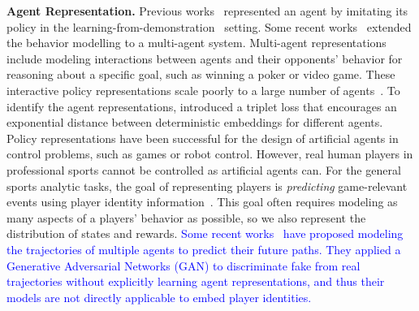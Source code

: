\documentclass[letterpaper]{article} %
\begin{document}
{\bf Agent Representation.}
Previous works~\cite{guenter2007reinforcement,KoberP08policy,Kormushev13RLRobotics} represented an agent by imitating its policy in the learning-from-demonstration~\cite{Argall09lfd} setting.  Some recent works~\cite{AlbrechtSurvey18,GroverRepresent18,RubinPoker11,BakkesHehavior12} extended the behavior modelling to a multi-agent system. Multi-agent representations include modeling interactions between agents and their opponents' behavior for reasoning about a specific goal, such as winning a poker or video game. These interactive policy representations scale poorly to a large number of agents~\cite{AlbrechtSurvey18,AlbrechtR16}.
To identify the agent representations, \cite{GroverRepresent18} introduced a triplet loss that encourages an exponential distance between deterministic embeddings for different agents.
Policy representations have been successful for the design of artificial agents in control problems, such as games or robot control. However, 
real human players in professional sports cannot be controlled as artificial agents can. For the general sports analytic tasks, the goal of representing players is {\em predicting} game-relevant events using player identity information~\cite{ganguly2018problem,schwartz,Schumaker2010SportStats}. This goal often requires modeling as many aspects of a players' behavior as possible, so we also represent 
the distribution of states and rewards.
\textcolor{blue}{Some recent works~\cite{Sadeghian2019SoPhie,Gupta18SocialGan} have proposed modeling the trajectories of multiple agents to predict their future paths. They applied a Generative Adversarial Networks (GAN) to discriminate fake from real trajectories without explicitly learning agent representations, and thus their models are not directly applicable to embed  player identities.} 
\end{document}
